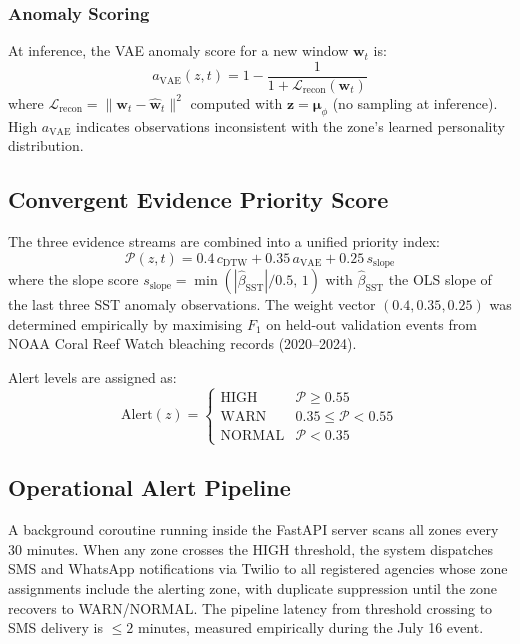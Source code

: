\documentclass[journal]{IEEEtran}
\begin{document}
\subsubsection{Anomaly Scoring}

At inference, the VAE anomaly score for a new window $\mathbf{w}_t$ is:
\begin{equation}
a_{\text{VAE}}(z,t) = 1 - \frac{1}{1 + \mathcal{L}_{\text{recon}}(\mathbf{w}_t)}
\label{eq:vae_score}
\end{equation}
where $\mathcal{L}_{\text{recon}} = \|\mathbf{w}_t - \hat{\mathbf{w}}_t\|^2$
computed with $\mathbf{z} = \bm{\mu}_\phi$ (no sampling at inference).
High $a_{\text{VAE}}$ indicates observations inconsistent with the
zone's learned personality distribution.

\subsection{Convergent Evidence Priority Score}

The three evidence streams are combined into a unified priority index:
\begin{equation}
\mathcal{P}(z,t) = 0.4\,c_{\text{DTW}} + 0.35\,a_{\text{VAE}} + 0.25\,s_{\text{slope}}
\label{eq:priority}
\end{equation}
where the slope score $s_{\text{slope}} = \min(|\hat{\beta}_{\text{SST}}| / 0.5,\, 1)$
with $\hat{\beta}_{\text{SST}}$ the OLS slope of the last three SST
anomaly observations. The weight vector $(0.4, 0.35, 0.25)$ was
determined empirically by maximising $F_1$ on held-out validation events
from NOAA Coral Reef Watch bleaching records (2020--2024).

Alert levels are assigned as:
\begin{equation}
\text{Alert}(z) = \begin{cases}
\text{HIGH}   & \mathcal{P} \geq 0.55\\
\text{WARN}   & 0.35 \leq \mathcal{P} < 0.55\\
\text{NORMAL} & \mathcal{P} < 0.35
\end{cases}
\label{eq:alert}
\end{equation}

\subsection{Operational Alert Pipeline}

A background coroutine running inside the FastAPI server scans all
zones every 30 minutes. When any zone crosses the HIGH threshold, the
system dispatches SMS and WhatsApp notifications via Twilio to all
registered agencies whose zone assignments include the alerting zone,
with duplicate suppression until the zone recovers to WARN/NORMAL.
The pipeline latency from threshold crossing to SMS delivery is
$\leq 2$ minutes, measured empirically during the July 16 event.
\end{document}
